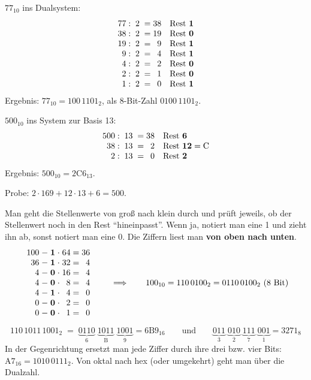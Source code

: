\noindent\begin{minipage}[t]{0.48\linewidth}
$77_{10}$ ins Dualsystem:
\[
\begin{array}{r@{\;:\;2\;=\;}r@{\quad\text{Rest }}c}
77 & 38 & \mathbf{1} \\
38 & 19 & \mathbf{0} \\
19 & 9 & \mathbf{1} \\
9 & 4 & \mathbf{1} \\
4 & 2 & \mathbf{0} \\
2 & 1 & \mathbf{0} \\
1 & 0 & \mathbf{1}
\end{array}
\]
Ergebnis: $77_{10} = 100\,1101_2$, als 8-Bit-Zahl $0100\,1101_2$.
\end{minipage}\hfill
\begin{minipage}[t]{0.48\linewidth}
$500_{10}$ ins System zur Basis 13:
\[
\begin{array}{r@{\;:\;13\;=\;}r@{\quad\text{Rest }}l}
500 & 38 & \mathbf{6} \\
38 & 2 & \mathbf{12} = \mathrm{C} \\
2 & 0 & \mathbf{2}
\end{array}
\]
Ergebnis: $500_{10} = \mathrm{2C6}_{13}$.

\smallskip
Probe: $2 \cdot 169 + 12 \cdot 13 + 6 = 500$.
\end{minipage}

Man geht die Stellenwerte von groß nach klein durch und prüft jeweils, ob der Stellenwert noch in den Rest \enquote{hineinpasst}. Wenn ja, notiert man eine 1 und zieht ihn ab, sonst notiert man eine 0. Die Ziffern liest man \textbf{von oben nach unten}.
\[
\begin{array}{r@{\;-\;}c@{\;\cdot\;}r@{\;=\;}r}
100 & \mathbf{1} & 64 & 36 \\
36 & \mathbf{1} & 32 & 4 \\
4 & \mathbf{0} & 16 & 4 \\
4 & \mathbf{0} & 8 & 4 \\
4 & \mathbf{1} & 4 & 0 \\
0 & \mathbf{0} & 2 & 0 \\
0 & \mathbf{0} & 1 & 0
\end{array}
\qquad\Longrightarrow\qquad 100_{10} = 110\,0100_2 = 0110\,0100_2 \text{ (8 Bit)}
\]

\[
110\,1011\,1001_2
\;=\; \underbrace{0110}_{6}\;\underbrace{1011}_{\mathrm{B}}\;\underbrace{1001}_{9} = \mathrm{6B9}_{16}
\qquad\text{und}\qquad
\underbrace{011}_{3}\;\underbrace{010}_{2}\;\underbrace{111}_{7}\;\underbrace{001}_{1} = 3271_8
\]
In der Gegenrichtung ersetzt man jede Ziffer durch ihre drei bzw. vier Bits: $\mathrm{A7}_{16} = 1010\,0111_2$. Von oktal nach hex (oder umgekehrt) geht man über die Dualzahl.

